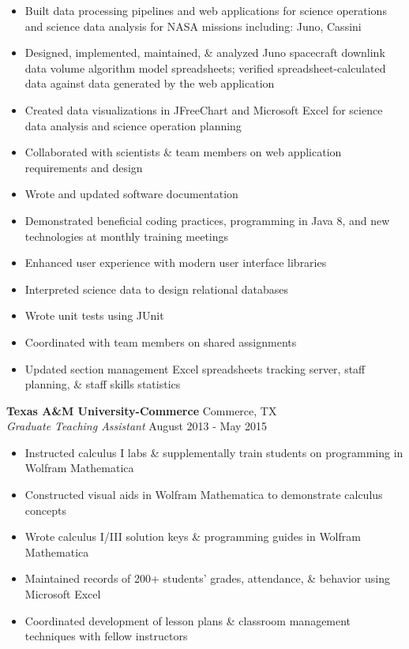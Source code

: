 \documentclass[a4paper]{article}
\begin{document}
\begin{itemize} \itemsep 1pt
	\item Built data processing pipelines and web applications for science operations and science data analysis for NASA missions including: Juno, Cassini
	\item Designed, implemented, maintained, \& analyzed Juno spacecraft downlink data volume algorithm model spreadsheets; verified spreadsheet-calculated data against data generated by the web application
	\item Created data visualizations in JFreeChart and Microsoft Excel for science data analysis and science operation planning
	\item Collaborated with scientists \& team members on web application requirements and design
	\item Wrote and updated software documentation
	\item Demonstrated beneficial coding practices, programming in Java 8, and new technologies at monthly training meetings
	\item Enhanced user experience with modern user interface libraries
	\item Interpreted science data to design relational databases
	\item Wrote unit tests using JUnit
	\item Coordinated with team members on shared assignments
	\item Updated section management Excel spreadsheets tracking server, staff planning, \& staff skills statistics
\end{itemize}
\textbf{Texas A\&M University-Commerce} \hfill Commerce, TX\\
\textit{Graduate Teaching Assistant} \hfill August 2013 - May 2015\\
\vspace{-1mm}
\begin{itemize} \itemsep 1pt
	\item Instructed calculus I labs \& supplementally train students on programming in Wolfram Mathematica
	\item Constructed visual aids in Wolfram Mathematica to demonstrate calculus concepts
	\item Wrote calculus I/III solution keys \& programming guides in Wolfram Mathematica
	\item Maintained records of 200+ students’ grades, attendance, \& behavior using Microsoft Excel
	\item Coordinated development of lesson plans \& classroom management techniques with fellow instructors
\end{itemize}
\end{document}
